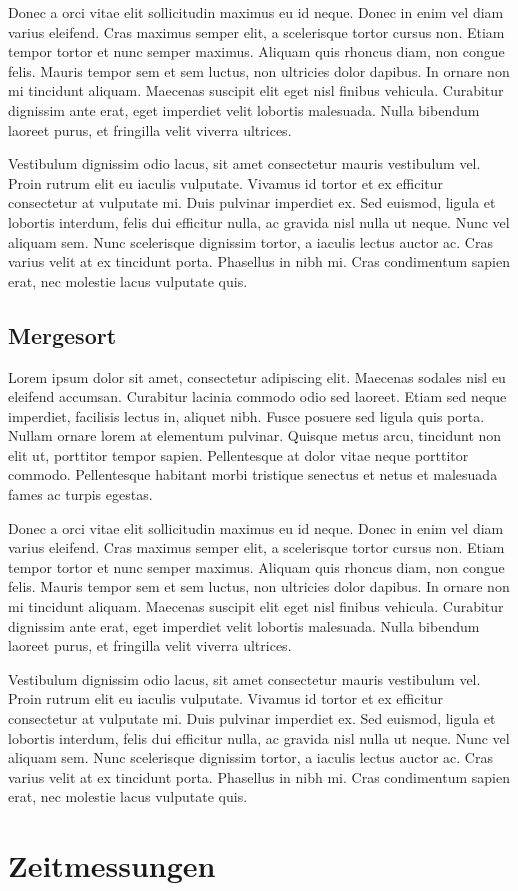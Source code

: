 \documentclass[12pt, a4paper, titlepage, hidelinks]{scrreprt}
\begin{document}
Donec a orci vitae elit sollicitudin maximus eu id neque. Donec in enim vel diam varius eleifend. Cras maximus semper elit, a scelerisque tortor cursus non. Etiam tempor tortor et nunc semper maximus. Aliquam quis rhoncus diam, non congue felis. Mauris tempor sem et sem luctus, non ultricies dolor dapibus. In ornare non mi tincidunt aliquam. Maecenas suscipit elit eget nisl finibus vehicula. Curabitur dignissim ante erat, eget imperdiet velit lobortis malesuada. Nulla bibendum laoreet purus, et fringilla velit viverra ultrices.

Vestibulum dignissim odio lacus, sit amet consectetur mauris vestibulum vel. Proin rutrum elit eu iaculis vulputate. Vivamus id tortor et ex efficitur consectetur at vulputate mi. Duis pulvinar imperdiet ex. Sed euismod, ligula et lobortis interdum, felis dui efficitur nulla, ac gravida nisl nulla ut neque. Nunc vel aliquam sem. Nunc scelerisque dignissim tortor, a iaculis lectus auctor ac. Cras varius velit at ex tincidunt porta. Phasellus in nibh mi. Cras condimentum sapien erat, nec molestie lacus vulputate quis. 

\section{Mergesort}
Lorem ipsum dolor sit amet, consectetur adipiscing elit. Maecenas sodales nisl eu eleifend accumsan. Curabitur lacinia commodo odio sed laoreet. Etiam sed neque imperdiet, facilisis lectus in, aliquet nibh. Fusce posuere sed ligula quis porta. Nullam ornare lorem at elementum pulvinar. Quisque metus arcu, tincidunt non elit ut, porttitor tempor sapien. Pellentesque at dolor vitae neque porttitor commodo. Pellentesque habitant morbi tristique senectus et netus et malesuada fames ac turpis egestas.

Donec a orci vitae elit sollicitudin maximus eu id neque. Donec in enim vel diam varius eleifend. Cras maximus semper elit, a scelerisque tortor cursus non. Etiam tempor tortor et nunc semper maximus. Aliquam quis rhoncus diam, non congue felis. Mauris tempor sem et sem luctus, non ultricies dolor dapibus. In ornare non mi tincidunt aliquam. Maecenas suscipit elit eget nisl finibus vehicula. Curabitur dignissim ante erat, eget imperdiet velit lobortis malesuada. Nulla bibendum laoreet purus, et fringilla velit viverra ultrices.

Vestibulum dignissim odio lacus, sit amet consectetur mauris vestibulum vel. Proin rutrum elit eu iaculis vulputate. Vivamus id tortor et ex efficitur consectetur at vulputate mi. Duis pulvinar imperdiet ex. Sed euismod, ligula et lobortis interdum, felis dui efficitur nulla, ac gravida nisl nulla ut neque. Nunc vel aliquam sem. Nunc scelerisque dignissim tortor, a iaculis lectus auctor ac. Cras varius velit at ex tincidunt porta. Phasellus in nibh mi. Cras condimentum sapien erat, nec molestie lacus vulputate quis. 

\chapter{Zeitmessungen}


\end{document}
